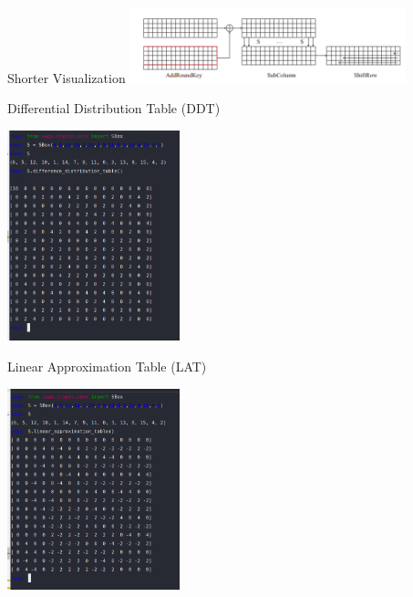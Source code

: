 \begin{frame}
\begin{block}{Shorter Visualization}
    \centering
\includegraphics[width=8cm]{img_13.png}
\centering
    \end{block}
\end{frame}

\begin{frame}{Differential Distribution Table (DDT)
}
\begin{block}{}
\centering
\includegraphics[width=50mm]{img_1.png}
\centering
\end{block}
    
\end{frame}


\begin{frame}{Linear Approximation Table (LAT)
}
\begin{block}{}
\centering
\includegraphics[width=50mm]{img_2.png}
\centering
\end{block}
    
\end{frame}


